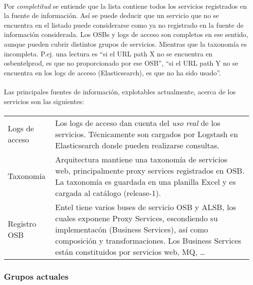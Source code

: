 \paragraph{}
Por \emph{completitud} se entiende que la lista contiene
todos los servicios registrados en la fuente de informaci\'on.
As\'i se puede deducir que un servicio que no se encuentra en el listado puede
considerarse como ya no registrado en la fuente de informaci\'on considerada.
Los OSBs y logs de acceso son completos en ese sentido,
aunque pueden cubrir distintos grupos de servicios.
Mientras que la taxonom\'ia es incompleta.
P.ej. una lectura es
``si el URL path X no se encuentra en osbentelprod, es que no proporcionado por ese OSB'',
``si el URL path Y no se encuentra en los logs de acceso (Elasticsearch), es que no ha sido usado''.

\paragraph{}
Las principales fuentes de informaci\'on, explotables actualmente,
acerca de los servicios son las siguientes:

\paragraph{}
\begin{tabular}{lp{}}
    Logs de acceso
    &
    Los logs de acceso dan cuenta del \emph{uso real} de los servicios.
    T\'ecnicamente son cargados por Logstash en Elasticsearch donde pueden
    realizarse consultas.
    \\
    Taxonom\'ia
    &
    Arquitectura mantiene una taxonom\'ia de servicios web,
    principalmente proxy services registrados en OSB.
    La taxonom\'ia es guardada en una planilla Excel y es cargada al cat\'alogo
    (release-1).
    \\
    Registro OSB
    &
    Entel tiene varios buses de servicio OSB y ALSB, los cuales exponene Proxy Services,
    escondiendo su implementac\'on (Business Services), as\'i como composici\'on y 
    transformaciones. Los Business Services est\'an constituidos por servicios web, 
    MQ, \ldots
\end{tabular}


\subsubsection{Grupos actuales}
